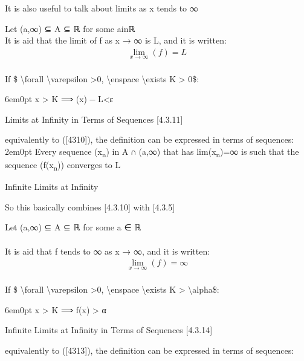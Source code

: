 It is also useful to talk about limits as {x} tends to ∞

Let ({a},∞) ⊆ {A} ⊆ ℝ for some {ain}ℝ\\
It is aid that the limit of {f} as {x} → ∞ is {L}, and it is written:\\
\[\begin{aligned}
\lim_{x\rightarrow
\infty}\left( f \right) =
L \tag{4.3.10}
\label{4310}\end{aligned}\]\\

If \$ \textbackslash forall \textbackslash varepsilon \textgreater0,
\textbackslash enspace \textbackslash exists K \textgreater{} 0\$:

6em0pt
{x} \textgreater{} {K} ⟹ ({x}) − {L}\textbar\textless{}{ε}

Limits at Infinity in Terms of Sequences {[}4.3.11{]}

equivalently to ({[}4310{]}), the definition can be expressed in terms
of sequences:\\

2em0pt Every sequence ({x}\textsubscript{{n}}) in {A} ∩ ({a},∞) that has
lim({x}\textsubscript{{n}})=∞ is such that the sequence
({f}({x}\textsubscript{{n}})) converges to {L}

Infinite Limits at
Infinity\protect\hypertarget{infinite-limits-at-infinity}{}{}

So this basically combines {[}4.3.10{]} with {[}4.3.5{]}

Let ({a},∞) ⊆ {A} ⊆ ℝ for some {a} ∈ ℝ\\
~\\
It is aid that {f} tends to ∞ as {x} → ∞, and it is written:\\
\[\begin{aligned}
\lim_{x\rightarrow
\infty}\left( f \right) =
\infty \tag{4.3.13}
\label{4313}\end{aligned}\]\\

If \$ \textbackslash forall \textbackslash varepsilon \textgreater0,
\textbackslash enspace \textbackslash exists K \textgreater{}
\textbackslash alpha\$:

6em0pt {x} \textgreater{} {K} ⟹ {f}({x}) \textgreater{} {α}

Infinite Limits at Infinity in Terms of Sequences {[}4.3.14{]}

equivalently to ({[}4313{]}), the definition can be expressed in terms
of sequences:\\

